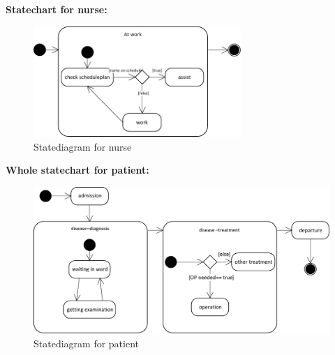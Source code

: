  
    \textbf{Statechart for nurse:}
\begin{figure}[!htb]
  \centering  
  \includegraphics[width=0.7\textwidth]{pics/ub3/b/1b_nurse_stat} 
  \caption{Statediagram for nurse}
  \label{fig:1b_nurse_stat} 
 \end{figure}

\newpage 
\textbf{Whole statechart for patient:}
\begin{figure}[!htb]
  \centering  
  \includegraphics[width=1\textwidth]{pics/ub3/b/1b_pat_stat} 
  \caption{Statediagram for patient}
  \label{fig:1b_pat_stat} 
 \end{figure}
 


 
